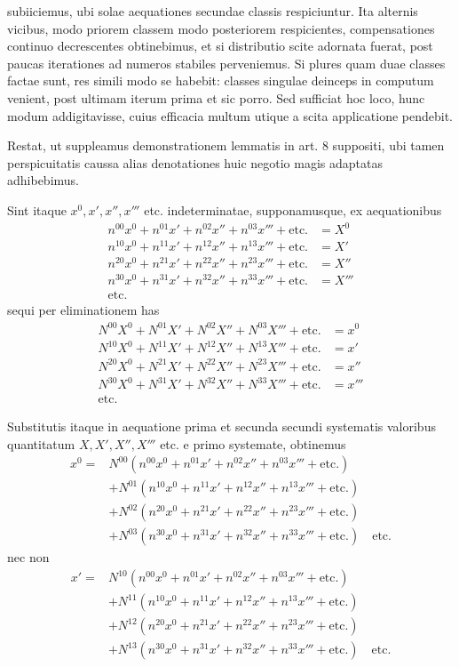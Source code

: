 subiiciemus, ubi solae aequationes secundae classis respiciuntur. Ita alternis vicibus, modo priorem classem modo posteriorem respicientes, compensationes continuo decrescentes obtinebimus, et si distributio scite adornata fuerat, post paucas iterationes ad numeros stabiles perveniemus. Si plures quam duae classes factae sunt, res simili modo se habebit: classes singulae deinceps in computum venient, post ultimam iterum prima et sic porro. Sed sufficiat hoc loco, hunc modum addigitavisse, cuius efficacia multum utique a scita applicatione pendebit.

Restat, ut suppleamus demonstrationem lemmatis in art. 8 suppositi, ubi tamen perspicuitatis caussa alias denotationes huic negotio magis adaptatas adhibebimus.

Sint itaque \(x^0,x',x'',x'''\) etc. indeterminatae, supponamusque, ex aequationibus
\[
\begin{aligned}
n^{00}x^0+n^{01}x'+n^{02}x''+n^{03}x'''+\text{etc.}&=X^0\\
n^{10}x^0+n^{11}x'+n^{12}x''+n^{13}x'''+\text{etc.}&=X'\\
n^{20}x^0+n^{21}x'+n^{22}x''+n^{23}x'''+\text{etc.}&=X''\\
n^{30}x^0+n^{31}x'+n^{32}x''+n^{33}x'''+\text{etc.}&=X'''\\
\text{etc.}&
\end{aligned}
\]
sequi per eliminationem has
\[
\begin{aligned}
N^{00}X^0+N^{01}X'+N^{02}X''+N^{03}X'''+\text{etc.}&=x^0\\
N^{10}X^0+N^{11}X'+N^{12}X''+N^{13}X'''+\text{etc.}&=x'\\
N^{20}X^0+N^{21}X'+N^{22}X''+N^{23}X'''+\text{etc.}&=x''\\
N^{30}X^0+N^{31}X'+N^{32}X''+N^{33}X'''+\text{etc.}&=x'''\\
\text{etc.}&
\end{aligned}
\]

Substitutis itaque in aequatione prima et secunda secundi systematis valoribus quantitatum \(X,X',X'',X'''\) etc. e primo systemate, obtinemus
\[
\begin{aligned}
x^0={}&N^{00}(n^{00}x^0+n^{01}x'+n^{02}x''+n^{03}x'''+\text{etc.})\\
&+N^{01}(n^{10}x^0+n^{11}x'+n^{12}x''+n^{13}x'''+\text{etc.})\\
&+N^{02}(n^{20}x^0+n^{21}x'+n^{22}x''+n^{23}x'''+\text{etc.})\\
&+N^{03}(n^{30}x^0+n^{31}x'+n^{32}x''+n^{33}x'''+\text{etc.})\quad\text{etc.}
\end{aligned}
\]
nec non
\[
\begin{aligned}
x'={}&N^{10}(n^{00}x^0+n^{01}x'+n^{02}x''+n^{03}x'''+\text{etc.})\\
&+N^{11}(n^{10}x^0+n^{11}x'+n^{12}x''+n^{13}x'''+\text{etc.})\\
&+N^{12}(n^{20}x^0+n^{21}x'+n^{22}x''+n^{23}x'''+\text{etc.})\\
&+N^{13}(n^{30}x^0+n^{31}x'+n^{32}x''+n^{33}x'''+\text{etc.})\quad\text{etc.}
\end{aligned}
\]

